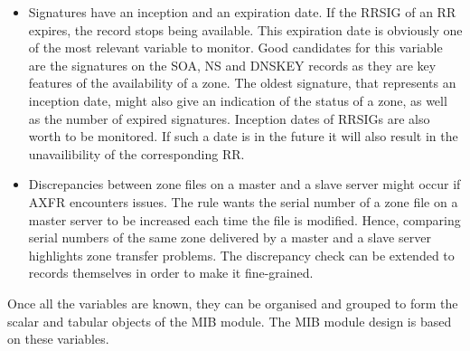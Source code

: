 \begin{itemize}
\item Signatures have an inception and an expiration date. If the RRSIG of an RR expires, the record stops being available. This expiration date is obviously one of the most relevant variable to monitor. Good candidates for this variable are the signatures on the SOA, NS and DNSKEY records as they are key features of the availability of a zone. The oldest signature, that represents an inception date, might also give an indication of the status of a zone, as well as the number of expired signatures. Inception dates of RRSIGs are also worth to be monitored. If such a date is in the future it will also result in the unavailibility of the corresponding RR. 

\item Discrepancies between zone files on a master and a slave server might occur if AXFR encounters issues. The rule wants the serial number of a zone file on a master server to be increased each time the file is modified. Hence, comparing serial numbers of the same zone delivered by a master and a slave server highlights zone transfer problems. The discrepancy check can be extended to records themselves in order to make it fine-grained.      

\end{itemize}
Once all the variables are known, they can be organised and grouped to form the scalar and tabular objects of the MIB module. The MIB module design is based on these variables.